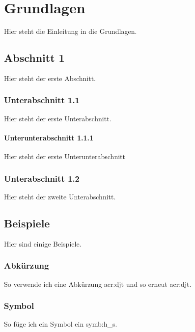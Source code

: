 
\chapter{Grundlagen}
\label{chap:fundamentals_related-work}
Hier steht die Einleitung in die Grundlagen.

\section{Abschnitt 1}
\label{sec:Abschnitt1}

Hier steht der erste Abschnitt.


\subsection{Unterabschnitt 1.1}
\label{subsec:Unterabschnitt1}

Hier steht der erste Unterabschnitt.


\subsubsection{Unterunterabschnitt 1.1.1}
\label{subsub:Unterunterabschnitt1}

Hier steht der erste Unterunterabschnitt

\subsection{Unterabschnitt 1.2}
\label{subsec:Unterabschnitt12}

Hier steht der zweite Unterabschnitt.


\section{Beispiele}
\label{sec:Bsp}


Hier sind einige Beispiele.

\subsection{Abkürzung}
\label{subsec:abkürzung}

So verwende ich eine Abkürzung \gls{acr:djt} und so erneut \gls{acr:djt}.

\subsection{Symbol}
\label{subsec:symbol}
So füge ich ein Symbol ein \gls{symb:h_s}.

